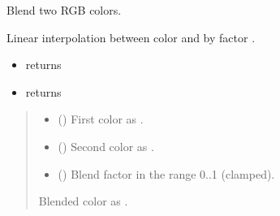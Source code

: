 \documentclass[letterpaper,10pt,english]{sphinxmanual}
\begin{document}
\begin{fulllineitems}
\label{\detokenize{api/colors:colors.blend}}
\pysigstartsignatures
\pysiglinewithargsret
{}
{\sphinxparamcomma {}\sphinxparamcomma {}}
{}
\pysigstopsignatures
\sphinxAtStartPar
Blend two RGB colors.

\sphinxAtStartPar
Linear interpolation between color  and  by factor .
\begin{itemize}
\item {} 
\sphinxAtStartPar
{} returns 

\item {} 
\sphinxAtStartPar
{} returns 

\end{itemize}
\begin{quote}\begin{description}
\begin{itemize}
\item {} 
\sphinxAtStartPar
{} () \textendash{} First color as .

\item {} 
\sphinxAtStartPar
{} () \textendash{} Second color as .

\item {} 
\sphinxAtStartPar
{} () \textendash{} Blend factor in the range 0..1 (clamped).

\end{itemize}

\sphinxAtStartPar
{}

\sphinxAtStartPar
Blended color as .

\end{description}\end{quote}

\end{fulllineitems}
\end{document}
